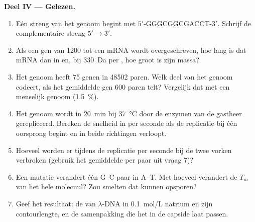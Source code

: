 \begin{problem}
\medskip
\noindent\textbf{Deel IV --- Gelezen.}
\begin{enumerate}[resume]
  \item Eén streng van het genoom begint met $5'$-GGGCGGCGACCT-$3'$.
        Schrijf de complementaire streng $5' \to 3'$.
  \item Als een gen van \num{1200}  tot een mRNA wordt
        overgeschreven, hoe lang is dat mRNA dan in  en, bij
        \qty{330}{Da} per , hoe groot is zijn massa?
  \item Het genoom heeft \qty{75}{} genen in \num{48502} paren. Welk deel
        van het genoom codeert, als het gemiddelde gen \num{600} paren
        telt? Vergelijk dat met een menselijk genoom (\qty{1.5}{\%}).
  \item Het genoom wordt in \qty{20}{min} bij \qty{37}{\celsius} door de
        enzymen van de gastheer gerepliceerd. Bereken de snelheid in
         per seconde als de replicatie bij één oorsprong begint
        en in beide richtingen verloopt.
  \item Hoeveel  worden er tijdens de replicatie per
        seconde bij de twee vorken verbroken (gebruik het gemiddelde per
        paar uit vraag 7)?
  \item Een mutatie verandert één G--C-paar in A--T. Met hoeveel verandert
        de $T_m$ van het hele molecuul? Zou smelten dat kunnen opsporen?
  \item Geef het resultaat: de  van $\lambda$-DNA in
        \qty{0.1}{mol/L} natrium en zijn contourlengte, en de samenpakking
        die het in de capside laat passen.
\end{enumerate}
\end{problem}
